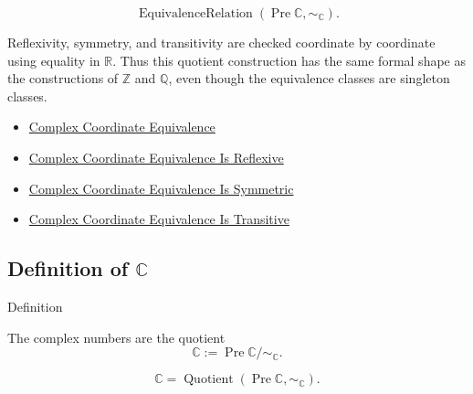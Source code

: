 \begin{remark*}
\[
\operatorname{EquivalenceRelation}(\operatorname{Pre}\mathbb{C},\sim_{\mathbb{C}}).
\]
\end{remark*}

\begin{remark*}[Interpretation]
Reflexivity, symmetry, and transitivity are checked coordinate by coordinate
using equality in \(\mathbb{R}\). Thus this quotient construction has the same
formal shape as the constructions of \(\mathbb{Z}\) and \(\mathbb{Q}\), even
though the equivalence classes are singleton classes.
\end{remark*}

\begin{dependencies}
\begin{itemize}
\item \hyperref[def:complex-coordinate-equivalence]{Complex Coordinate Equivalence}
  \item \hyperref[lem:complex-coordinate-equivalence-reflexive]{Complex Coordinate Equivalence Is Reflexive}
  \item \hyperref[lem:complex-coordinate-equivalence-symmetric]{Complex Coordinate Equivalence Is Symmetric}
  \item \hyperref[lem:complex-coordinate-equivalence-transitive]{Complex Coordinate Equivalence Is Transitive}
\end{itemize}
\end{dependencies}

\subsection*{\texorpdfstring{Definition of $\mathbb{C}$}{Definition of C}}

\begin{definitionbox}{Definition}
\begin{definition}
\label{def:complex-numbers}
The complex numbers are the quotient
\[
\mathbb{C}:=\operatorname{Pre}\mathbb{C}/{\sim_{\mathbb{C}}}.
\]
\end{definition}
\end{definitionbox}


\begin{remark*}
\[
\mathbb{C}=\operatorname{Quotient}(\operatorname{Pre}\mathbb{C},\sim_{\mathbb{C}}).
\]
\end{remark*}

